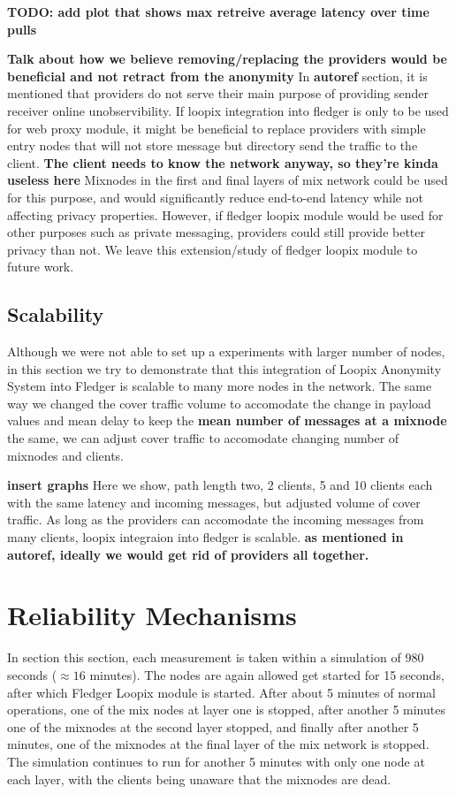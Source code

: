 \documentclass[a4paper,11pt,oneside]{report}
\begin{document}
\textbf{TODO: add plot that shows max retreive average latency over time pulls}

\textbf{Talk about how we believe removing/replacing the providers would be beneficial and not retract from the anonymity}
In \textbf{autoref} section, it is mentioned that providers do not serve their main purpose of providing sender receiver online unobservibility. If loopix integration into fledger is only to be used for web proxy module, it might be beneficial to replace providers with simple entry nodes that will not store message but directory send the traffic to the client. \textbf{The client needs to know the network anyway, so they're kinda useless here} Mixnodes in the first and final layers of mix network could be used for this purpose, and would significantly reduce end-to-end latency while not affecting privacy properties. However, if fledger loopix module would be used for other purposes such as private messaging, providers could still provide better privacy than not. We leave this extension/study of fledger loopix module to future work.

\subsection{Scalability}
Although we were not able to set up a experiments with larger number of nodes, in this section we try to demonstrate that this integration of Loopix Anonymity System into Fledger is scalable to many more nodes in the network. The same way we changed the cover traffic volume to accomodate the change in payload values and mean delay to keep the \textbf{mean number of messages at a mixnode} the same, we can adjust cover traffic to accomodate changing number of mixnodes and clients.

\textbf{insert graphs}
Here we show, path length two, 2 clients, 5 and 10 clients each with the same latency and incoming messages, but adjusted volume of cover traffic. As long as the providers can accomodate the incoming messages from many clients, loopix integraion into fledger is scalable. \textbf{as mentioned in autoref, ideally we would get rid of providers all together.}

\section{Reliability Mechanisms}
In section this section, each measurement is taken within a simulation of 980 seconds  (\(\approx 16\) minutes). The nodes are again allowed get started for 15 seconds, after which Fledger Loopix module is started. After about 5 minutes of normal operations, one of the mix nodes at layer one is stopped, after another 5 minutes one of the mixnodes at the second layer stopped, and finally after another 5 minutes, one of the mixnodes at the final layer of the mix network is stopped. The simulation continues to run for another 5 minutes with only one node at each layer, with the clients being unaware that the mixnodes are dead. 
\end{document}
